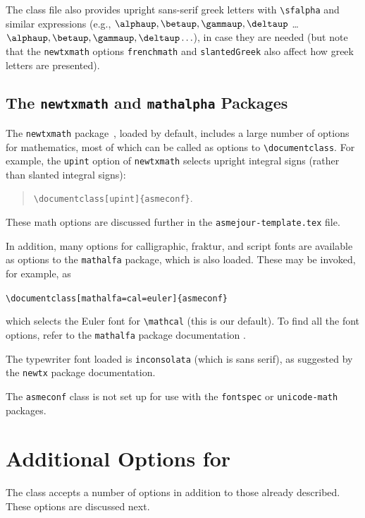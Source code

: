 \documentclass[varvw,largesc,upint,mathalfa=cal=euler,hyphenate,balance,lang-second=french,lang=english,colorlinks]{asmeconf} %
\begin{document}
The class file also provides upright sans-serif greek letters with \verb|\sfalpha| and similar expressions (e.g., $\sfalpha, \sfbeta, \sfgamma, \sfdelta$ \ldots $\bm{\sfalpha, \sfbeta, \sfgamma, \sfdelta \ldots}$), in case they are needed (but note that the \verb|newtxmath| options \verb|frenchmath| and \verb|slantedGreek| also affect how greek letters are presented).

\subsection{The \texttt{newtxmath} and \texttt{mathalpha} Packages~\cite{sharpe1,sharpe2}} The \texttt{newtxmath} package~\cite{sharpe1}, loaded by default, includes a large number of options for mathematics, most of which can be called as options to \verb|\documentclass|. For example, the \texttt{upint} option of \texttt{newtxmath} selects upright integral signs (rather than slanted integral signs):
\begin{quote}
\verb|\documentclass[upint]{asmeconf}|. 
\end{quote}  
These math options are discussed further in the \texttt{asmejour-template.tex} file. 

In addition, many options for calligraphic, fraktur, and script fonts are available as options to the \texttt{mathalfa} package, which is also loaded. These may be invoked, for example, as 
\begin{center}
\verb|\documentclass[mathalfa=cal=euler]{asmeconf}| 
\end{center}
which selects the Euler font for \verb|\mathcal| (this is our default). To find all the font options, refer to the \texttt{mathalfa} package documentation \cite{sharpe2}.

The typewriter font loaded is \texttt{inconsolata} (which is sans serif), as suggested by the \texttt{newtx} package documentation. 

The \texttt{asmeconf} class is not set up for use with the \texttt{fontspec} or \texttt{unicode-math} packages.



\section{Additional Options for }
The class accepts a number of options in addition to those already described. These options are discussed next.
\end{document}
